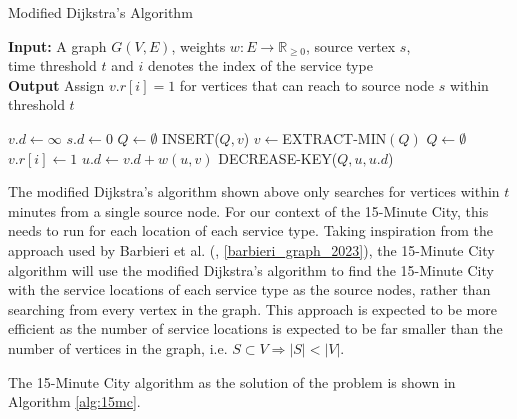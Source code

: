 \begin{algorithm}[H]
    \caption{Modified Dijkstra's Algorithm} \label{alg:modified_dijsktra}
    \textbf{Input:} A graph $G(V,E)$, weights $w:E\rightarrow\mathbb{R}_{\geq 0}$, source vertex $s$, \\  time threshold $t$ and $i$ denotes the index of the service type\\
    \textbf{Output} Assign $v.r[i]=1$ for vertices that can reach to source node $s$ within threshold $t$ %
    \begin{algorithmic}
            \State $v.d\gets\infty$
        \EndFor
        \State $s.d\gets 0$
        \State $Q\gets\emptyset$
            \State INSERT($Q,v$)
        \EndFor
            \State $v\gets$EXTRACT-MIN$(Q)$
                \State $Q\gets\emptyset$ 
            \Else
                \State $v.r[i] \gets 1 $
                        \State $u.d\gets v.d+w(u,v)$
                        \State DECREASE-KEY($Q,u,u.d$)
                    \EndIf
                \EndFor
            \EndIf
        \EndWhile
    \end{algorithmic}
\end{algorithm}

The modified Dijkstra's algorithm shown above only searches for vertices within $t$ minutes from a single source node. For our context of the 15-Minute City, this needs to run for each location of each service type. Taking inspiration from the approach used by Barbieri et al. (\cite{barbieri_graph_2023}, \ref{barbieri_graph_2023}), the 15-Minute City algorithm will use the modified Dijkstra's algorithm to find the 15-Minute City with the service locations of each service type as the source nodes, rather than searching from every vertex in the graph. This approach is expected to be more efficient as the number of service locations is expected to be far smaller than the number of vertices in the graph, $\text{i.e. }S\subset V\Rightarrow|S|<|V|$.

The 15-Minute City algorithm as the solution of the problem is shown in Algorithm \ref{alg:15mc}.

